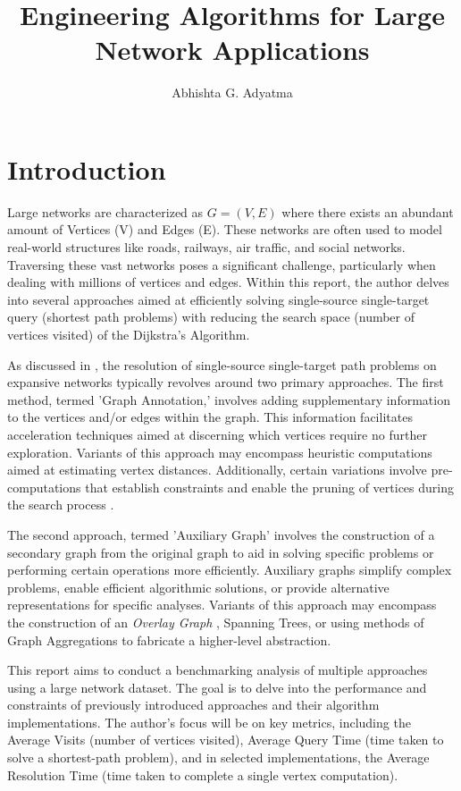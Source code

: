 \documentclass{article}
\title{Engineering Algorithms for Large Network Applications}
\author{Abhishta G. Adyatma}
\date{}
\begin{document}
\maketitle

\section{Introduction}

Large networks are characterized as $G = (V, E)$ where there exists an abundant amount of Vertices (V) and Edges (E).
These networks are often used to model real-world structures like roads, railways, air traffic, and social networks.
Traversing these vast networks poses a significant challenge, particularly when dealing with millions of vertices and edges.
Within this report, the author delves into several approaches aimed at efficiently solving single-source single-target query
(shortest path problems) with reducing the search space (number of vertices visited) of the Dijkstra's Algorithm.

As discussed in \cite{Zaroliagis2008}, the resolution of single-source single-target path problems on expansive 
networks typically revolves around two primary approaches. The first method, termed 'Graph Annotation,' involves 
adding supplementary information to the vertices and/or edges within the graph. This information facilitates 
acceleration techniques aimed at discerning which vertices require no further exploration. Variants of this 
approach may encompass heuristic computations aimed at estimating vertex distances. Additionally, certain variations
involve pre-computations that establish constraints and enable the pruning of vertices during the search process \cite{Wagner2005}.

The second approach, termed 'Auxiliary Graph' involves the construction of a secondary graph from 
the original graph to aid in solving specific problems or performing certain operations more efficiently.
Auxiliary graphs simplify complex problems, enable efficient algorithmic solutions, or provide alternative 
representations for specific analyses. Variants of this approach may encompass the construction of an 
\textit{Overlay Graph} \cite{Holzer2008}, Spanning Trees, or using methods of Graph Aggregations \cite{Sieranoja2022} to fabricate
a higher-level abstraction.

This report aims to conduct a benchmarking analysis of multiple approaches 
using a large network dataset. The goal is to delve into the performance and constraints of previously introduced approaches and their algorithm implementations. The author's focus 
will be on key metrics, including the Average Visits (number of vertices visited), Average Query Time (time taken to solve a shortest-path problem), and in selected implementations, the Average Resolution Time (time taken to complete a single vertex computation).
\end{document}
